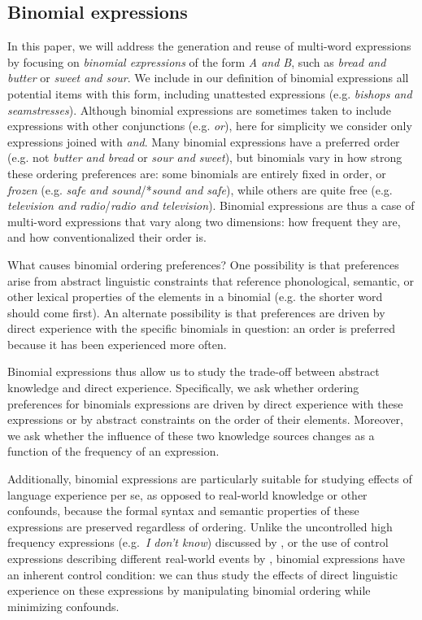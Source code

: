 \documentclass[authoryear]{elsarticle}
\begin{document}
\subsection{Binomial expressions}
In this paper, we will address the generation and reuse of multi-word expressions by focusing on \emph{binomial expressions} of the form \emph{A and B}, such as \emph{bread and butter} or \emph{sweet and sour}. We include in our definition of binomial expressions all potential items with this form, including unattested expressions (e.g. \emph{bishops and seamstresses}). Although binomial expressions are sometimes taken to include expressions with other conjunctions (e.g. \emph{or}), here for simplicity we consider only expressions joined with \emph{and}. Many binomial expressions have a preferred order (e.g. not \emph{butter and bread} or \emph{sour and sweet}), but binomials vary in how strong these ordering preferences are: some binomials are entirely fixed in order, or \emph{frozen} (e.g. \emph{safe and sound}/*\emph{sound and safe}), while others are quite free (e.g. \emph{television and radio}/\emph{radio and television}). Binomial expressions are thus a case of multi-word expressions that vary along two dimensions: how frequent they are, and how conventionalized their order is.

What causes binomial ordering preferences? One possibility is that preferences arise from abstract linguistic constraints that reference phonological, semantic, or other lexical properties of the elements in a binomial (e.g. the shorter word should come first). An alternate possibility is that preferences are driven by direct experience with the specific binomials in question: an order is preferred because it has been experienced more often.

Binomial expressions thus allow us to study the trade-off between abstract knowledge and direct experience. Specifically, we ask whether ordering preferences for binomials expressions are driven by direct experience with these expressions or by abstract constraints on the order of their elements. Moreover, we ask whether the influence of these two knowledge sources changes as a function of the frequency of an expression.

Additionally, binomial expressions are particularly suitable for studying effects of language experience per se, as opposed to real-world knowledge or other confounds, because the formal syntax and semantic properties of these expressions are preserved regardless of ordering. Unlike the uncontrolled high frequency expressions (e.g.\ \emph{I don't know}) discussed by \citet{Bybee:2006ul}, or the use of control expressions describing different real-world events by \citet[][e.g.\ \emph{Don't have to worry} vs.\ \emph{Don't have to wait}]{Arnon:2010hz}, binomial expressions have an inherent control condition: we can thus study the effects of direct linguistic experience on these expressions by manipulating binomial ordering while minimizing confounds.
\end{document}
